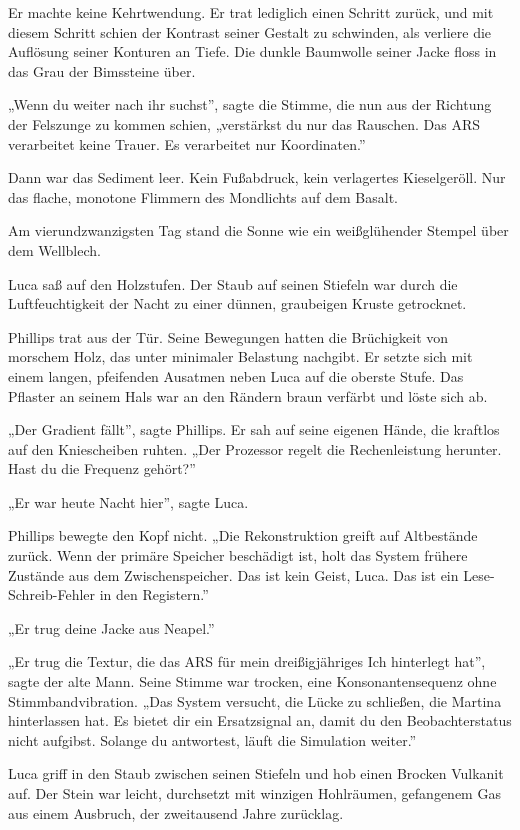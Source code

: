 \documentclass[
  ngerman,
]{article}
\begin{document}
Er machte keine Kehrtwendung. Er trat lediglich einen Schritt zurück,
und mit diesem Schritt schien der Kontrast seiner Gestalt zu schwinden,
als verliere die Auflösung seiner Konturen an Tiefe. Die dunkle
Baumwolle seiner Jacke floss in das Grau der Bimssteine über.

„Wenn du weiter nach ihr suchst'', sagte die Stimme, die nun aus der
Richtung der Felszunge zu kommen schien, „verstärkst du nur das
Rauschen. Das ARS verarbeitet keine Trauer. Es verarbeitet nur
Koordinaten.''

Dann war das Sediment leer. Kein Fußabdruck, kein verlagertes
Kieselgeröll. Nur das flache, monotone Flimmern des Mondlichts auf dem
Basalt.

Am vierundzwanzigsten Tag stand die Sonne wie ein weißglühender Stempel
über dem Wellblech.

Luca saß auf den Holzstufen. Der Staub auf seinen Stiefeln war durch die
Luftfeuchtigkeit der Nacht zu einer dünnen, graubeigen Kruste
getrocknet.

Phillips trat aus der Tür. Seine Bewegungen hatten die Brüchigkeit von
morschem Holz, das unter minimaler Belastung nachgibt. Er setzte sich
mit einem langen, pfeifenden Ausatmen neben Luca auf die oberste Stufe.
Das Pflaster an seinem Hals war an den Rändern braun verfärbt und löste
sich ab.

„Der Gradient fällt'', sagte Phillips. Er sah auf seine eigenen Hände,
die kraftlos auf den Kniescheiben ruhten. „Der Prozessor regelt die
Rechenleistung herunter. Hast du die Frequenz gehört?''

„Er war heute Nacht hier'', sagte Luca.

Phillips bewegte den Kopf nicht. „Die Rekonstruktion greift auf
Altbestände zurück. Wenn der primäre Speicher beschädigt ist, holt das
System frühere Zustände aus dem Zwischenspeicher. Das ist kein Geist,
Luca. Das ist ein Lese-Schreib-Fehler in den Registern.''

„Er trug deine Jacke aus Neapel.''

„Er trug die Textur, die das ARS für mein dreißigjähriges Ich hinterlegt
hat'', sagte der alte Mann. Seine Stimme war trocken, eine
Konsonantensequenz ohne Stimmbandvibration. „Das System versucht, die
Lücke zu schließen, die Martina hinterlassen hat. Es bietet dir ein
Ersatzsignal an, damit du den Beobachterstatus nicht aufgibst. Solange
du antwortest, läuft die Simulation weiter.''

Luca griff in den Staub zwischen seinen Stiefeln und hob einen Brocken
Vulkanit auf. Der Stein war leicht, durchsetzt mit winzigen Hohlräumen,
gefangenem Gas aus einem Ausbruch, der zweitausend Jahre zurücklag.
\end{document}

